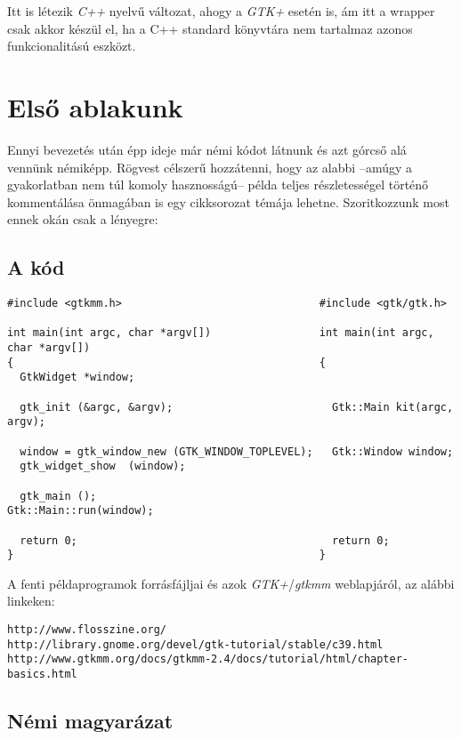\documentclass[a4paper,10pt]{article}
\begin{document}
Itt is létezik \textit{C++} nyelvű változat, ahogy a \textit{GTK+} esetén is, ám itt a wrapper csak akkor készül el, ha a C++ standard könyvtára nem tartalmaz azonos funkcionalitású eszközt.

\section{Első ablakunk}

Ennyi bevezetés után épp ideje már némi kódot látnunk és azt górcső alá vennünk némiképp. Rögvest célszerű hozzátenni, hogy az alabbi --amúgy a gyakorlatban nem túl komoly hasznosságú-- példa teljes részletességel történő kommentálása önmagában is egy cikksorozat témája lehetne. Szoritkozzunk most ennek okán csak a lényegre:

\subsection{A kód}

\vspace{16pt}
\fontsize{8pt}{8pt}
\begin{verbatim}
#include <gtkmm.h>                               #include <gtk/gtk.h>

int main(int argc, char *argv[])                 int main(int argc, char *argv[])
{                                                {
  GtkWidget *window;

  gtk_init (&argc, &argv);                         Gtk::Main kit(argc, argv);

  window = gtk_window_new (GTK_WINDOW_TOPLEVEL);   Gtk::Window window;
  gtk_widget_show  (window);

  gtk_main ();                                     Gtk::Main::run(window);

  return 0;                                        return 0;
}                                                }
\end{verbatim} 

A fenti példaprogramok forrásfájljai és azok \textit{GTK+}/\textit{gtkmm} weblapjáról, az alábbi linkeken:

\begin{verbatim}
http://www.flosszine.org/
http://library.gnome.org/devel/gtk-tutorial/stable/c39.html
http://www.gtkmm.org/docs/gtkmm-2.4/docs/tutorial/html/chapter-basics.html
\end{verbatim}

\subsection{Némi magyarázat}
\end{document}
